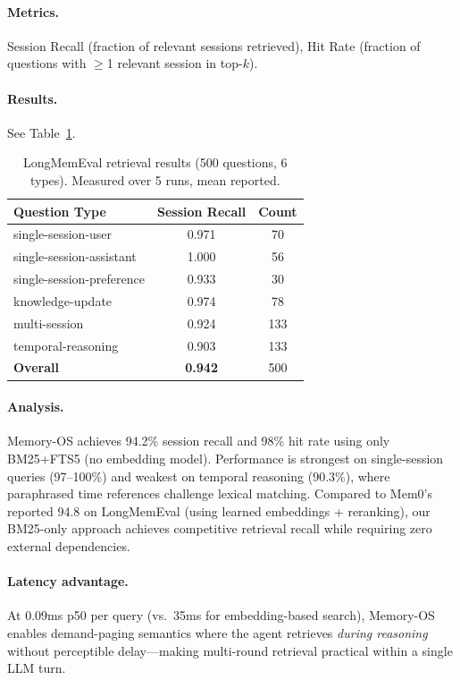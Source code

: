 \documentclass[10pt,twocolumn]{article}
\begin{document}
\paragraph{Metrics.} Session Recall (fraction of relevant sessions retrieved), Hit Rate (fraction of questions with $\geq$1 relevant session in top-$k$).

\paragraph{Results.} See Table~\ref{tab:longmemeval}.

\begin{table}[t]
\centering
\caption{LongMemEval retrieval results (500 questions, 6 types). Measured over 5 runs, mean reported.}
\label{tab:longmemeval}
\small
\begin{tabular}{lcc}
\toprule
Question Type & Session Recall & Count \\
\midrule
single-session-user       & 0.971 & 70 \\
single-session-assistant  & 1.000 & 56 \\
single-session-preference & 0.933 & 30 \\
knowledge-update          & 0.974 & 78 \\
multi-session             & 0.924 & 133 \\
temporal-reasoning        & 0.903 & 133 \\
\midrule
\textbf{Overall}          & \textbf{0.942} & 500 \\
\bottomrule
\end{tabular}
\end{table}

\paragraph{Analysis.} Memory-OS achieves 94.2\% session recall and 98\% hit rate using only BM25+FTS5 (no embedding model). Performance is strongest on single-session queries (97--100\%) and weakest on temporal reasoning (90.3\%), where paraphrased time references challenge lexical matching. Compared to Mem0's reported 94.8 on LongMemEval (using learned embeddings + reranking), our BM25-only approach achieves competitive retrieval recall while requiring zero external dependencies.

\paragraph{Latency advantage.} At 0.09ms p50 per query (vs.\ 35ms for embedding-based search), Memory-OS enables demand-paging semantics where the agent retrieves \emph{during reasoning} without perceptible delay---making multi-round retrieval practical within a single LLM turn.
\end{document}
